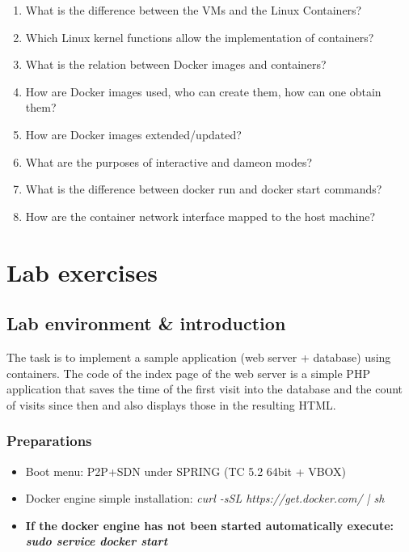 \documentclass[a4paper]{article}
\begin{document}
\begin{enumerate}
    \item What is the difference between the VMs and the Linux Containers?
    \item Which Linux kernel functions allow the implementation of containers?
    \item What is the relation between Docker images and containers?
    \item How are Docker images used, who can create them, how can one obtain them?
    \item How are Docker images extended/updated?
    \item What are the purposes of interactive and dameon modes?
    \item What is the difference between docker run and docker start commands?
    \item How are the container network interface mapped to the host machine?
\end{enumerate}

\section{Lab exercises}

\subsection{Lab environment \& introduction}

The task is to implement a sample application (web server + database) using containers. The code of the index page of the web server is a simple PHP application that saves the time of the first visit into the database and the count of visits since then and also displays those in the resulting HTML.

\subsubsection{Preparations}
\begin{itemize}

\item Boot menu: P2P+SDN under SPRING (TC 5.2 64bit + VBOX)

\item Docker engine simple installation: \emph{curl -sSL https://get.docker.com/ | sh}

\item \textbf{If the docker engine has not been started automatically execute: \emph{sudo service docker start}}

\end{itemize}
\end{document}
